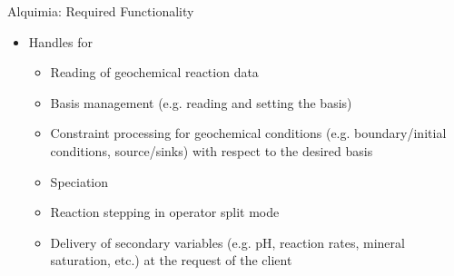 \documentclass{beamer}
\begin{document}
\begin{frame}{Alquimia: Required Functionality}
\begin{itemize}
\item Handles for
\begin{itemize}
\item Reading of geochemical reaction data
\item Basis management (e.g. reading and setting the basis)
\item Constraint processing for geochemical conditions (e.g. boundary/initial conditions, source/sinks) with respect to the desired basis
\item Speciation
\item Reaction stepping in operator split mode
\item Delivery of secondary variables (e.g. pH, reaction rates, mineral saturation, etc.) at the request of the client
\end{itemize}
\end{itemize}
\end{frame}
\end{document}
